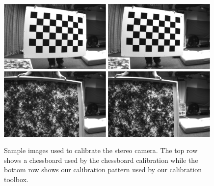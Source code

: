 \documentclass{report}
\begin{document}
\begin{figure}
\centering
\includegraphics[width=0.49\textwidth]{images/left000} 
\includegraphics[width=0.49\textwidth]{images/right000} \\ 
\vspace{3pt}
\includegraphics[width=0.49\textwidth]{images/left001} 
\includegraphics[width=0.49\textwidth]{images/right001} 
\caption{Sample images used to calibrate the stereo camera. The top row shows a chessboard used by the chessboard calibration while the bottom row shows our calibration pattern used by our calibration toolbox. }
\label{stereoImageFig}
\end{figure}
\end{document}
